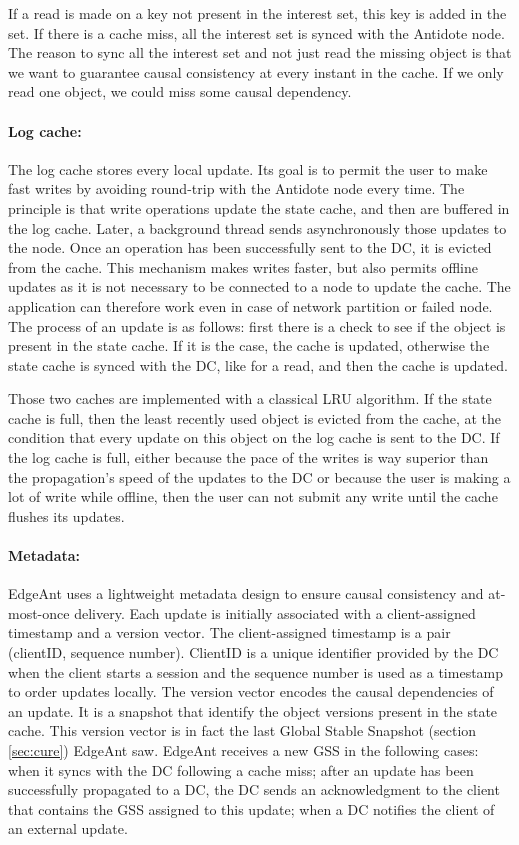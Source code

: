 \documentclass[11pt]{article}
\begin{document}
If a read is made on a key not present in the interest set, this key is added
in the set. If there is a cache miss, all the interest set is synced with the
Antidote node. The reason to sync all the interest set and not just read the
missing object is that we want to guarantee causal consistency at every
instant in the cache. If we only read one object, we could miss some causal
dependency.

\paragraph{Log cache:}
The log cache stores every local update. Its goal is to permit the user to
make fast writes by avoiding round-trip with the Antidote node every time. The
principle is that write operations update the state cache, and then are
buffered in the log cache. Later, a background thread sends asynchronously
those updates to the node. Once an operation has been successfully sent to the
DC, it is evicted from the cache. This mechanism makes writes faster, but also
permits offline updates as it is not necessary to be connected to a node to
update the cache. The application can therefore work even in case of network
partition or failed node. The process of an update is as follows: first there
is a check to see if the object is present in the state cache. If it is the
case, the cache is updated, otherwise the state cache is synced with the DC,
like for a read, and then the cache is updated.

Those two caches are implemented with a classical LRU algorithm. If the state
cache is full, then the least recently used object is evicted from the cache,
at the condition that every update on this object on the log cache is sent to
the DC. If the log cache is full, either because the pace of the writes is way
superior than the propagation's speed of the updates to the DC or because the
user is making a lot of write while offline, then the user can not submit any
write until the cache flushes its updates.


\paragraph{Metadata:}\mbox{}
EdgeAnt uses a lightweight metadata design to ensure causal consistency and
at-most-once delivery. Each update is initially associated with a
client-assigned timestamp and a version vector. The client-assigned timestamp
is a pair (clientID, sequence number). ClientID is a unique identifier
provided by the DC when the client starts a session and the sequence number is
used as a timestamp to order updates locally. The version vector encodes the
causal dependencies of an update. It is a snapshot that identify the object
versions present in the state cache. This version vector is in fact the last
Global Stable Snapshot (section \ref{sec:cure}) EdgeAnt saw. EdgeAnt receives
a new GSS in the following cases: when it syncs with the DC following a cache
miss; after an update has been successfully propagated to a DC, the DC sends
an acknowledgment to the client that contains the GSS assigned to this update;
when a DC notifies the client of an external update. 
\end{document}
